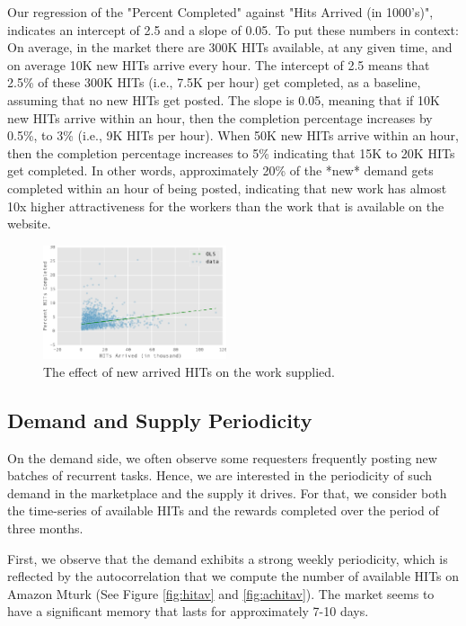 Our regression of the "Percent Completed" against "Hits Arrived (in
1000's)", indicates an intercept of 2.5 and a slope of 0.05. To put
these numbers in context: On average, in the market there are 300K
HITs available, at any given time, and on average 10K new HITs arrive
every hour. The intercept of 2.5 means that 2.5\% of these 300K HITs
(i.e., 7.5K per hour) get completed, as a baseline, assuming that no
new HITs get posted. The slope is 0.05, meaning that if 10K new HITs
arrive within an hour, then the completion percentage increases by
0.5\%, to 3\% (i.e., 9K HITs per hour). When 50K new HITs arrive within
an hour, then the completion percentage increases to 5\% indicating
that 15K to 20K HITs get completed. In other words, approximately 20\%
of the *new* demand gets completed within an hour of being posted,
indicating that new work has almost 10x higher attractiveness for the
workers than the work that is available on the website.

\begin{figure}[t!]
	\centering
		\includegraphics[width=0.48\textwidth]{figures/percent.pdf}
	\caption{The effect of new arrived HITs on the work  supplied.}
	\label{fig:perc_hits_completed}
\end{figure}

\subsection{Demand and Supply Periodicity}
On the demand side, we often observe some requesters frequently posting new batches of recurrent tasks. Hence, we are interested in the periodicity of such demand in the marketplace and the supply it drives. For that, we consider both the time-series of available HITs and the rewards completed over the period of three months. 

First, we observe that the demand exhibits a strong weekly periodicity, which is reflected by the autocorrelation that we compute the number of available HITs on Amazon Mturk (See Figure \ref{fig:hitav} and \ref{fig:achitav}). The market seems to have a significant memory that lasts for approximately 7-10 days.

